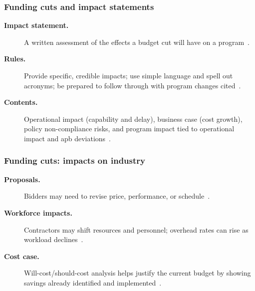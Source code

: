 \documentclass[../main.tex]{subfiles}
\begin{document}

\subsubsection{Funding cuts and impact statements}
\begin{description}
  \item[\textbf{Impact statement.}] A written assessment of the effects a budget cut will have on a program~\autocite{edo-3-1-4-budget-execution-2025}.
  \item[\textbf{Rules.}] Provide specific, credible impacts; use simple language and spell out acronyms; be prepared to follow through with program changes cited~\autocite{edo-3-1-4-budget-execution-2025}.
  \item[\textbf{Contents.}] Operational impact (capability and delay), business case (cost growth), policy non-compliance risks, and program impact tied to operational impact and \ac{apb} deviations~\autocite{edo-3-1-4-budget-execution-2025}.
\end{description}


\subsubsection{Funding cuts: impacts on industry}
\begin{description}
  \item[\textbf{Proposals.}] Bidders may need to revise price, performance, or schedule~\autocite{edo-3-1-4-budget-execution-2025}.
  \item[\textbf{Workforce impacts.}] Contractors may shift resources and personnel; overhead rates can rise as workload declines~\autocite{edo-3-1-4-budget-execution-2025}.
  \item[\textbf{Cost case.}] Will-cost/should-cost analysis helps justify the current budget by showing savings already identified and implemented~\autocite{edo-3-1-4-budget-execution-2025}.
\end{description}
\end{document}
